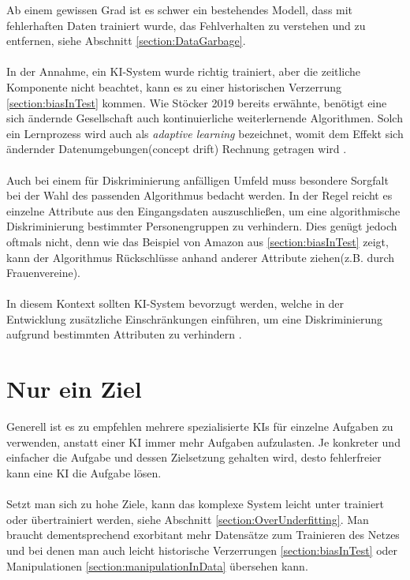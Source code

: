 \documentclass[12pt,oneside,a4paper,parskip]{scrbook}
\begin{document}
Ab einem gewissen Grad ist es schwer ein bestehendes Modell, dass mit fehlerhaften Daten trainiert wurde, das Fehlverhalten zu verstehen und zu entfernen, siehe Abschnitt \ref{section:DataGarbage}.
\\\\
In der Annahme, ein KI-System wurde richtig trainiert, aber die zeitliche Komponente nicht beachtet, kann es zu einer historischen Verzerrung \ref{section:biasInTest} kommen.
Wie Stöcker 2019 \cite{stoecker} bereits erwähnte, benötigt eine sich ändernde Gesellschaft auch kontinuierliche weiterlernende Algorithmen. Solch ein Lernprozess wird auch als \textit{adaptive learning} bezeichnet, womit dem Effekt sich ändernder Datenumgebungen(concept drift) Rechnung getragen wird \cite{gama}.%
\\\\
Auch bei einem für Diskriminierung anfälligen Umfeld muss besondere Sorgfalt bei der Wahl des passenden Algorithmus bedacht werden. In der Regel reicht es einzelne Attribute aus den Eingangsdaten auszuschließen, um eine algorithmische Diskriminierung bestimmter Personengruppen zu verhindern. Dies genügt jedoch oftmals nicht, denn wie das Beispiel von Amazon aus \ref{section:biasInTest} zeigt, kann der Algorithmus Rückschlüsse anhand anderer Attribute ziehen(z.B. durch Frauenvereine).
\\\\
In diesem Kontext sollten KI-System bevorzugt werden, welche in der Entwicklung zusätzliche Einschränkungen einführen, um eine Diskriminierung aufgrund bestimmten Attributen zu verhindern \cite{kamiran}.

\section{Nur ein Ziel}
\label{section:oneGoal}

Generell ist es zu empfehlen mehrere spezialisierte KIs für einzelne Aufgaben zu verwenden, anstatt einer KI immer mehr Aufgaben aufzulasten. Je konkreter und einfacher die Aufgabe und dessen Zielsetzung gehalten wird, desto fehlerfreier kann eine KI die Aufgabe lösen.\\\\
Setzt man sich zu hohe Ziele, kann das komplexe System leicht unter trainiert oder übertrainiert werden, siehe Abschnitt \ref{section:OverUnderfitting}. Man braucht dementsprechend exorbitant mehr Datensätze zum Trainieren des Netzes und bei denen man auch leicht historische Verzerrungen \ref{section:biasInTest} oder Manipulationen \ref{section:manipulationInData} übersehen kann.
\end{document}
